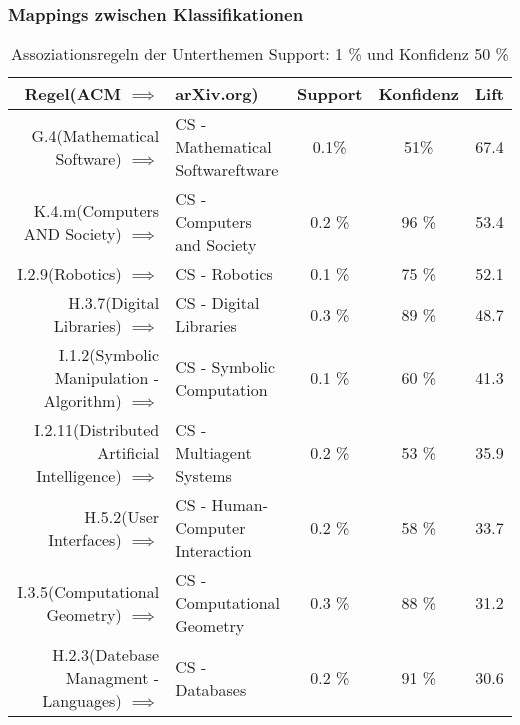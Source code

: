 \subsubsection{Mappings zwischen Klassifikationen}
\begin{table}[H]
\centering %
\begin{tabular}{|rl|c|c|c|}
	\hline
	\textbf{Regel(ACM $\implies$ }  &\textbf{arXiv.org)} & {Support} &\textbf{Konfidenz} & \textbf{Lift}\\
	\hline
	\small G.4(Mathematical Software) $\implies$ & \small CS - Mathematical Softwareftware & 0.1\% &51\% &67.4  \\
	\small K.4.m(Computers AND Society) $\implies$ & \small CS - Computers and Society &0.2 \% &96 \%  &53.4 \\
	\small I.2.9(Robotics) $\implies$ & \small CS - Robotics &0.1 \% & 75 \%  &52.1 \\
	\small H.3.7(Digital Libraries) $\implies$ & \small CS - Digital Libraries &0.3 \% &89 \% &48.7 \\
	\small I.1.2(Symbolic Manipulation - Algorithm) $\implies$ & \small CS - Symbolic Computation  &0.1 \% &60 \%  &41.3 \\
	\small I.2.11(Distributed Artificial Intelligence) $\implies$ & \small CS - Multiagent Systems  &0.2 \% &53 \%  &35.9 \\
	\small H.5.2(User Interfaces) $\implies$ & \small CS - Human-Computer Interaction &0.2 \% &58 \%  &33.7 \\
	\small I.3.5(Computational Geometry) $\implies$ & \small CS - Computational Geometry &0.3 \% &88 \%  &31.2 \\
	\small H.2.3(Datebase Managment - Languages) $\implies$ & \small CS - Databases &0.2 \% &91 \%  &30.6 \\
	\hline
\end{tabular}
 \caption{Assoziationsregeln der Unterthemen Support: 1 \% und Konfidenz 50 \%}
\end{table}
